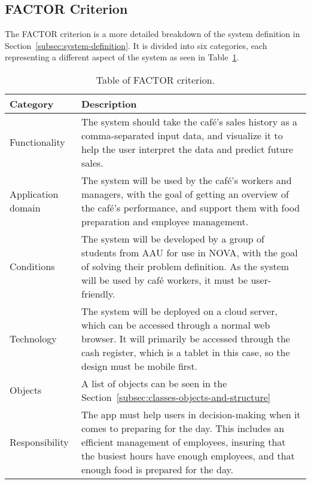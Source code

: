 \subsection{FACTOR Criterion}\label{subsec:factor-criterion}

The FACTOR criterion is a more detailed breakdown of the system definition in Section~\ref{subsec:system-definition}.
It is divided into six categories, each representing a different aspect of the system as seen in
Table~\ref{tab:factor-criterion}.

\begin{table}[H]
    \begin{tabularx}{\textwidth}{ l X }
        \toprule
        \textbf{Category} & \textbf{Description}
        \\ \midrule
        Functionality
        & The system should take the café's sales history as a comma-separated input data, and visualize it to
        help the user interpret the data and predict future sales.
        \\ \midrule
        Application domain
        & The system will be used by the café's workers and managers, with the goal of getting an
        overview of the café's performance, and support them with food preparation and employee management.
        \\ \midrule
        Conditions
        & The system will be developed by a group of students from AAU for use in NOVA, with the goal of solving
        their problem definition.
        As the system will be used by café workers, it must be user-friendly.
        \\ \midrule
        Technology
        & The system will be deployed on a cloud server, which can be accessed through a normal web browser.
        It will primarily be accessed through the cash register, which is a tablet in this case, so the design must be
        mobile first.
        \\ \midrule
        Objects
        & A list of objects can be seen in the Section~\ref{subsec:classes-objects-and-structure}
        \\ \midrule
        Responsibility
        & The app must help users in decision-making when it comes to preparing for the day.
        This includes an efficient management of employees, insuring that the busiest hours have enough employees, and
        that enough food is prepared for the day.
        \\ \bottomrule
    \end{tabularx}
    \caption{Table of FACTOR criterion.
    }\label{tab:factor-criterion}
\end{table}
